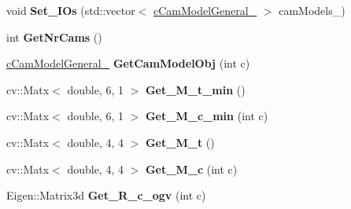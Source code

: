 \begin{DoxyCompactItemize}
\item 
void {\bfseries Set\+\_\+\+I\+Os} (std\+::vector$<$ \hyperlink{classMultiColSLAM_1_1cCamModelGeneral__}{c\+Cam\+Model\+General\+\_\+} $>$ cam\+Models\+\_\+)\hypertarget{classMultiColSLAM_1_1cMultiCamSys___aafd27e6e2abbb9e6785b1d562eb863a0}{}\label{classMultiColSLAM_1_1cMultiCamSys___aafd27e6e2abbb9e6785b1d562eb863a0}

\item 
int {\bfseries Get\+Nr\+Cams} ()\hypertarget{classMultiColSLAM_1_1cMultiCamSys___ad06f07ebb253231e62be662b271b29fa}{}\label{classMultiColSLAM_1_1cMultiCamSys___ad06f07ebb253231e62be662b271b29fa}

\item 
\hyperlink{classMultiColSLAM_1_1cCamModelGeneral__}{c\+Cam\+Model\+General\+\_\+} {\bfseries Get\+Cam\+Model\+Obj} (int c)\hypertarget{classMultiColSLAM_1_1cMultiCamSys___a83137646fa518549ea0dbc47bff7a19b}{}\label{classMultiColSLAM_1_1cMultiCamSys___a83137646fa518549ea0dbc47bff7a19b}

\item 
cv\+::\+Matx$<$ double, 6, 1 $>$ {\bfseries Get\+\_\+\+M\+\_\+t\+\_\+min} ()\hypertarget{classMultiColSLAM_1_1cMultiCamSys___a4d73aea59fec86187cae86fad0abcf65}{}\label{classMultiColSLAM_1_1cMultiCamSys___a4d73aea59fec86187cae86fad0abcf65}

\item 
cv\+::\+Matx$<$ double, 6, 1 $>$ {\bfseries Get\+\_\+\+M\+\_\+c\+\_\+min} (int c)\hypertarget{classMultiColSLAM_1_1cMultiCamSys___a96e69baff40ac22079a732070245d9d9}{}\label{classMultiColSLAM_1_1cMultiCamSys___a96e69baff40ac22079a732070245d9d9}

\item 
cv\+::\+Matx$<$ double, 4, 4 $>$ {\bfseries Get\+\_\+\+M\+\_\+t} ()\hypertarget{classMultiColSLAM_1_1cMultiCamSys___a826084e53d1948770b010afb7914c67a}{}\label{classMultiColSLAM_1_1cMultiCamSys___a826084e53d1948770b010afb7914c67a}

\item 
cv\+::\+Matx$<$ double, 4, 4 $>$ {\bfseries Get\+\_\+\+M\+\_\+c} (int c)\hypertarget{classMultiColSLAM_1_1cMultiCamSys___a4de21b71db310b287cc666bed789109e}{}\label{classMultiColSLAM_1_1cMultiCamSys___a4de21b71db310b287cc666bed789109e}

\item 
Eigen\+::\+Matrix3d {\bfseries Get\+\_\+\+R\+\_\+c\+\_\+ogv} (int c)\hypertarget{classMultiColSLAM_1_1cMultiCamSys___a87f8e9e1e66b1416078d416acf5f1f39}{}\label{classMultiColSLAM_1_1cMultiCamSys___a87f8e9e1e66b1416078d416acf5f1f39}


\end{DoxyCompactItemize}
